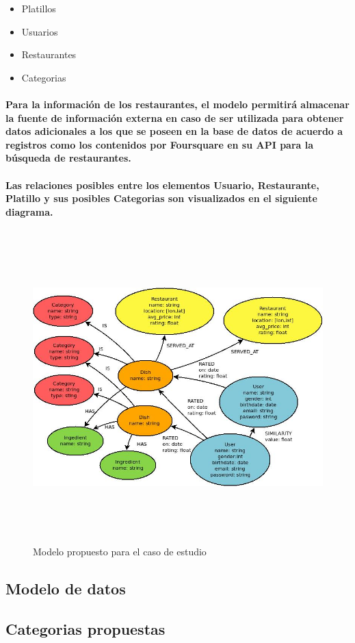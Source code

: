 \begin{itemize}
  \item Platillos
  \item Usuarios
  \item Restaurantes
  \item Categorias 
\end{itemize}

\paragraph{Para la información de los restaurantes, el modelo  permitirá almacenar la fuente de información externa en caso de ser utilizada para obtener datos adicionales a los que se poseen en la base de datos de acuerdo a registros como los contenidos por Foursquare en su API para la búsqueda de restaurantes.}

\paragraph{Las relaciones posibles entre los elementos Usuario, Restaurante, Platillo y sus posibles Categorias son visualizados en el siguiente diagrama.}

\newpage
    \begin{landscape}
      \begin{figure}[h!]
      \centering
      \includegraphics[width=22.5cm,height=12cm]{./images/modelo_sc.jpg}
      \caption{Modelo propuesto para el caso de estudio}
    \end{figure}
    \end{landscape}
  \newpage

\newpage
\subsection{Modelo de datos}
   

\subsection{Categorias propuestas}
   

